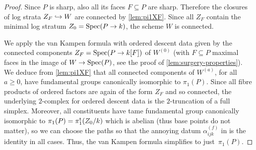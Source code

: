 \begin{proof}
Since $P$ is sharp, also all its faces $F \subseteq P$ are sharp. Therefore the closures of log strata $Z_F \hookrightarrow W$ are connected by \cref{lem:pi1XF}. Since all $Z_F$ contain the minimal log stratum $Z_0 = \operatorname{Spec}(P \to k)$, the scheme $W$ is connected. 

We apply the van Kampen formula with ordered descent data given by the  connected components $Z_F = \operatorname{Spec}(P \to k[F])$ of $W^{(0)}$ (with $F \subseteq P$ maximal faces in the image of $W \to \operatorname{Spec}(P)$, see the proof of \cref{lem:surgery-properties}). We deduce from \cref{lem:pi1XF} that all connected components of $W^{(a)}$, for all $a\geq 0$, have fundamental groups canonically isomorphic to $\pi_1(P)$.  Since all fibre products of ordered factors are again of the form $Z_F$ and so connected, the underlying $2$-complex for ordered descent data is the $2$-truncation of a full simplex. Moreover, all constituents have tame fundamental group canonically isomorphic to $\pi_1(P) = \pi_1^{\mathrm{t}}(Z_0/k)$ which is abelian (thus base points do not matter), so we can choose the paths so that the annoying datum $\alpha_{ijk}^{(f)}$ in \cite[Corollary~5.3]{Stix2006:vanKampen} is the identity in all cases. Thus, the van Kampen formula simplifies to just~$\pi_1(P)$.
\end{proof}

